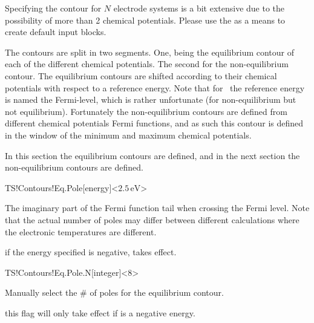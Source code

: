 Specifying the contour for $N$ electrode systems is a bit extensive
due to the possibility of more than 2 chemical potentials. Please use
the  as a means to create default input
blocks.

The contours are split in two segments. One, being the equilibrium
contour of each of the different chemical potentials. The second for
the non-equilibrium contour. The equilibrium contours are shifted
according to their chemical potentials with respect to a reference
energy. Note that for \tsiesta\ the reference energy is named the
Fermi-level, which is rather unfortunate (for non-equilibrium but not
equilibrium). Fortunately the non-equilibrium contours are defined
from different chemical potentials Fermi functions, and as such this
contour is defined in the window of the minimum and maximum chemical
potentials.

In this section the equilibrium contours are defined, and in the next
section the non-equilibrium contours are defined.

\begin{fdfentry}{TS!Contours!Eq.Pole}[energy]<$2.5\,\mathrm{eV}$>

  The imaginary part of the Fermi function tail when crossing the
  Fermi level. Note that the actual number of poles may differ between
  different calculations where the electronic temperatures are
  different.

  \note if the energy specified is negative,
   takes effect.
  
\end{fdfentry}

\begin{fdfentry}{TS!Contours!Eq.Pole.N}[integer]<8>

  Manually select the \# of poles for the equilibrium contour. 

  \note this flag will only take effect if 
  is a negative energy.
  
\end{fdfentry}

